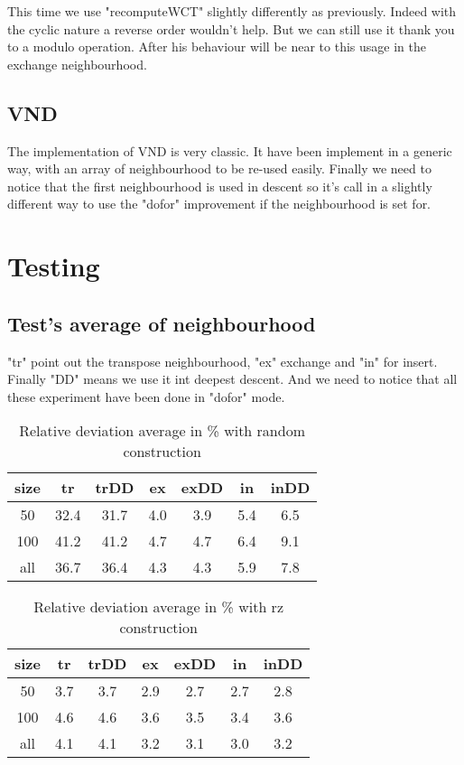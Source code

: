 \documentclass[12pt,a4paper]{article}
\begin{document}
This time we use "recomputeWCT" slightly differently as previously. Indeed with the cyclic nature a reverse order wouldn't help. But we can still use it thank you to a modulo operation. After his behaviour will be near to this usage in the exchange neighbourhood.

\subsection{VND}

The implementation of VND is very classic. It have been implement in a generic way, with an array of neighbourhood to be re-used easily. Finally we need to notice that the first neighbourhood is used in descent so it's call in a slightly different way to use the "dofor" improvement if the neighbourhood is set for.

\section{Testing}

\subsection{Test's average of neighbourhood}

"tr" point out the transpose neighbourhood, "ex" exchange and "in" for insert. Finally "DD" means we use it int deepest descent. And we need to notice that all these experiment have been done in "dofor" mode.

\begin{table}[!h]
\centering
\begin{tabular}{|*{7}{c|}}
  \hline
  size & tr & trDD & ex & exDD & in & inDD \\
  \hline
  50 & 32.4 & 31.7 & 4.0 & 3.9 & 5.4 & 6.5 \\ %
  100 & 41.2 & 41.2 & 4.7 & 4.7 & 6.4 & 9.1 \\ %
  all & 36.7 & 36.4 & 4.3 & 4.3 & 5.9 & 7.8 \\ %
  \hline
\end{tabular}
\caption{Relative deviation average in \% with random construction}
\label{Relative deviation with random construction}
\end{table}

\begin{table}[!h]
\centering
\begin{tabular}{|*{7}{c|}}
  \hline
  size & tr & trDD & ex & exDD & in & inDD \\
  \hline
  50 & 3.7 & 3.7 & 2.9 & 2.7 & 2.7 & 2.8 \\ %
  100 & 4.6 & 4.6 & 3.6 & 3.5 & 3.4 & 3.6 \\ %
  all & 4.1 & 4.1 & 3.2 & 3.1 & 3.0 & 3.2 \\ %
  \hline
\end{tabular}
\caption{Relative deviation average in \% with rz construction}
\label{Relative deviation with rz construction}
\end{table}
\end{document}
